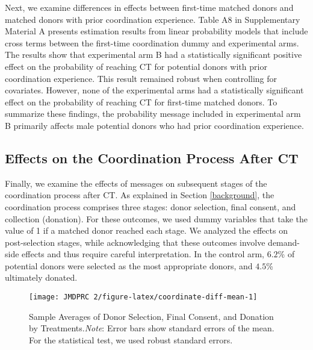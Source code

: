 \documentclass[12pt, a4paper]{article}
\begin{document}
Next, we examine differences in effects between first-time matched donors and matched donors with prior coordination experience. Table A8 in Supplementary Material A presents estimation results from linear probability models that include cross terms between the first-time coordination dummy and experimental arms. The results show that experimental arm B had a statistically significant positive effect on the probability of reaching CT for potential donors with prior coordination experience. This result remained robust when controlling for covariates. However, none of the experimental arms had a statistically significant effect on the probability of reaching CT for first-time matched donors. To summarize these findings, the probability message included in experimental arm B primarily affects male potential donors who had prior coordination experience.

\hypertarget{process}{%
\subsection{Effects on the Coordination Process After CT}\label{process}}

Finally, we examine the effects of messages on subsequent stages of the coordination process after CT. As explained in Section \ref{background}, the coordination process comprises three stages: donor selection, final consent, and collection (donation). For these outcomes, we used dummy variables that take the value of 1 if a matched donor reached each stage. We analyzed the effects on post-selection stages, while acknowledging that these outcomes involve demand-side effects and thus require careful interpretation. In the control arm, \(6.2\)\% of potential donors were selected as the most appropriate donors, and \(4.5\)\% ultimately donated.

\begin{figure}[t]
\texttt{[image: JMDPRC~2/figure-latex/coordinate-diff-mean-1]} \caption{Sample Averages of Donor Selection, Final Consent, and Donation by Treatments.\newline \emph{Note}: Error bars show standard errors of the mean. For the statistical test, we used robust standard errors.}\label{fig:coordinate-diff-mean}
\end{figure}
\end{document}
